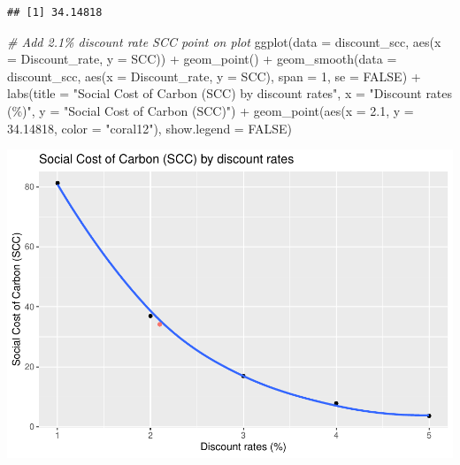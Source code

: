 \documentclass[
]{article}
\newenvironment{Shaded}{\begin{snugshade}}{\end{snugshade}}
\newcommand{\AttributeTok}[1]{\textcolor[rgb]{0.77,0.63,0.00}{#1}}
\newcommand{\CommentTok}[1]{\textcolor[rgb]{0.56,0.35,0.01}{\textit{#1}}}
\newcommand{\ConstantTok}[1]{\textcolor[rgb]{0.00,0.00,0.00}{#1}}
\newcommand{\DecValTok}[1]{\textcolor[rgb]{0.00,0.00,0.81}{#1}}
\newcommand{\FloatTok}[1]{\textcolor[rgb]{0.00,0.00,0.81}{#1}}
\newcommand{\FunctionTok}[1]{\textcolor[rgb]{0.00,0.00,0.00}{#1}}
\newcommand{\NormalTok}[1]{#1}
\newcommand{\OtherTok}[1]{\textcolor[rgb]{0.56,0.35,0.01}{#1}}
\newcommand{\SpecialCharTok}[1]{\textcolor[rgb]{0.00,0.00,0.00}{#1}}
\newcommand{\StringTok}[1]{\textcolor[rgb]{0.31,0.60,0.02}{#1}}
\begin{document}
\begin{Shaded}
\end{Shaded}

\begin{verbatim}
## [1] 34.14818
\end{verbatim}

\begin{Shaded}
\begin{Highlighting}[]
\CommentTok{\# Add 2.1\% discount rate SCC point on plot}
\FunctionTok{ggplot}\NormalTok{(}\AttributeTok{data =}\NormalTok{ discount\_scc, }\FunctionTok{aes}\NormalTok{(}\AttributeTok{x =}\NormalTok{ Discount\_rate, }\AttributeTok{y =}\NormalTok{ SCC)) }\SpecialCharTok{+}
  \FunctionTok{geom\_point}\NormalTok{() }\SpecialCharTok{+}
  \FunctionTok{geom\_smooth}\NormalTok{(}\AttributeTok{data =}\NormalTok{ discount\_scc, }\FunctionTok{aes}\NormalTok{(}\AttributeTok{x =}\NormalTok{ Discount\_rate, }\AttributeTok{y =}\NormalTok{ SCC), }\AttributeTok{span =} \DecValTok{1}\NormalTok{, }\AttributeTok{se =} \ConstantTok{FALSE}\NormalTok{) }\SpecialCharTok{+}
  \FunctionTok{labs}\NormalTok{(}\AttributeTok{title =} \StringTok{"Social Cost of Carbon (SCC) by discount rates"}\NormalTok{, }\AttributeTok{x =} \StringTok{"Discount rates (\%)"}\NormalTok{, }\AttributeTok{y =} \StringTok{"Social Cost of Carbon (SCC)"}\NormalTok{) }\SpecialCharTok{+}
  \FunctionTok{geom\_point}\NormalTok{(}\FunctionTok{aes}\NormalTok{(}\AttributeTok{x =} \FloatTok{2.1}\NormalTok{, }\AttributeTok{y =} \FloatTok{34.14818}\NormalTok{, }\AttributeTok{color =} \StringTok{"coral12"}\NormalTok{), }\AttributeTok{show.legend =} \ConstantTok{FALSE}\NormalTok{)}
\end{Highlighting}
\end{Shaded}

\includegraphics{Homework-4-Code_files/figure-latex/unnamed-chunk-6-1.pdf}
\end{document}

